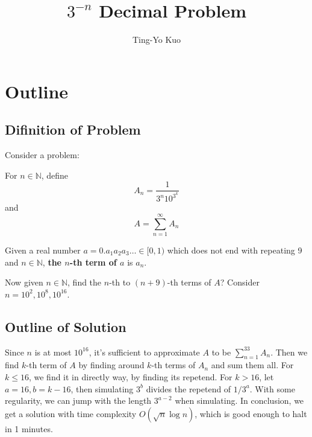 \documentclass[paper=a4]{scrartcl}
\title{$3^{-n}$ Decimal Problem}
\author{Ting-Yo Kuo}
\date{}
\begin{document}
\maketitle
\setcounter{section}{0}
\section{Outline}
\subsection{Difinition of Problem}
Consider a problem:

\begin{tcolorbox}[arc=0pt,colback=white,title={Definition}]
For $n\in\mathbb{N}$, define 
\[
A_n=\frac{1}{3^n10^{3^k}}
\]
and
\[
A=\sum_{n=1}^\infty A_n
\]
\end{tcolorbox}
\begin{tcolorbox}[arc=0pt,colback=white,title={Definition}]
Given a real number $a=0.a_1a_2a_3\ldots\in[0,1)$ which does not end with repeating 9 and $n\in\mathbb{N}$, \textbf{the $n$-th term of $a$} is $a_n$.  
\end{tcolorbox}
Now given $n\in\mathbb{N}$,  find the $n$-th to $(n+9)$-th terms of $A$? Consider $n=10^2,10^8,10^{16}$.

\subsection{Outline of Solution}
Since $n$ is at most $10^{16}$, it's sufficient to approximate $A$ to be $\sum_{n=1}^{33}A_n$. Then we find $k$-th term of $A$ by finding around $k$-th terms of $A_n$ and sum them all. For $k\leq 16$, we find it in directly way, by finding its repetend. For $k>16$, let $a = 16, b = k-16$, then simulating $3^b$ divides the repetend of $1/3^a$. With some regularity, we can jump with the length $3^{a-2}$ when simulating. In conclusion, we get a solution with time complexity $O(\sqrt{n}\log n)$, which is good enough to halt in 1 minutes.
\end{document}
